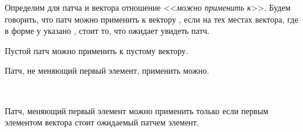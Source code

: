 Определим для патча и вектора отношение <<\emph{можно применить к}>>.
Будем говорить, что патч  можно применить к вектору
, если на тех местах вектора, где в форме у 
указано , стоит то, что ожидает увидеть
патч.

\begin{code}%
\>[0]\<[2]%
\>[2]  \AgdaSymbol{:}  \AgdaSymbol{\{}\AgdaSymbol{\}\{} \AgdaSymbol{:}  \AgdaSymbol{\}}          \<%
\end{code}

Пустой патч можно применить к пустому вектору.

\begin{code}%
\>[2]\<[4]%
\>[4] \AgdaSymbol{:}   \AgdaInductiveConstructor{[]}\<%
\end{code}

Патч, не меняющий первый элемент, применить можно.

\begin{code}%
\>[2]\<[4]%
\>[4] \AgdaSymbol{:}  \AgdaSymbol{\{}\AgdaSymbol{\}\{} \AgdaSymbol{:}  \AgdaSymbol{\}\{} \AgdaSymbol{:}  \AgdaSymbol{\}\{} \AgdaSymbol{:}   \AgdaSymbol{\}}\<%
\\
\>[4]\<[6]%
\>[6] \AgdaSymbol{(} \AgdaSymbol{:} \AgdaSymbol{)}      \AgdaSymbol{(} \AgdaSymbol{)}  \AgdaSymbol{(}  \AgdaSymbol{)}\<%
\end{code}

Патч, меняющий первый элемент можно применить только если первым
элементом вектора стоит ожидаемый патчем элемент.

